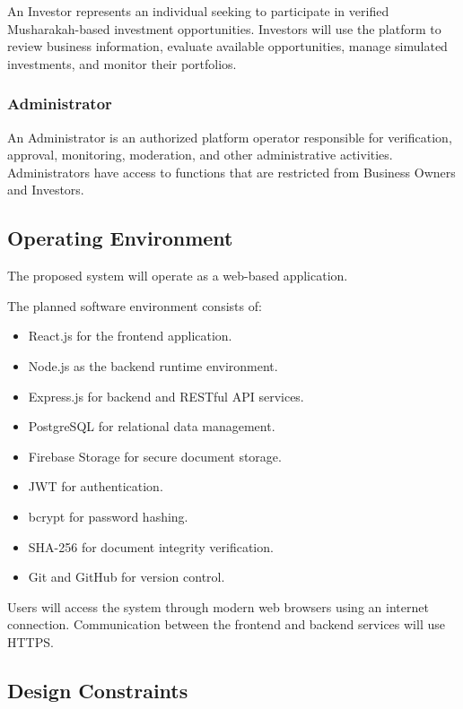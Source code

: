 An Investor represents an individual seeking to participate in verified
Musharakah-based investment opportunities. Investors will use the platform
to review business information, evaluate available opportunities, manage
simulated investments, and monitor their portfolios.

\subsubsection{Administrator}

An Administrator is an authorized platform operator responsible for
verification, approval, monitoring, moderation, and other administrative
activities. Administrators have access to functions that are restricted
from Business Owners and Investors.


\subsection{Operating Environment}

The proposed system will operate as a web-based application.

The planned software environment consists of:

\begin{itemize}
    \item React.js for the frontend application.
    \item Node.js as the backend runtime environment.
    \item Express.js for backend and RESTful API services.
    \item PostgreSQL for relational data management.
    \item Firebase Storage for secure document storage.
    \item JWT for authentication.
    \item bcrypt for password hashing.
    \item SHA-256 for document integrity verification.
    \item Git and GitHub for version control.
\end{itemize}

Users will access the system through modern web browsers using an internet
connection. Communication between the frontend and backend services will
use HTTPS.


\subsection{Design Constraints}

